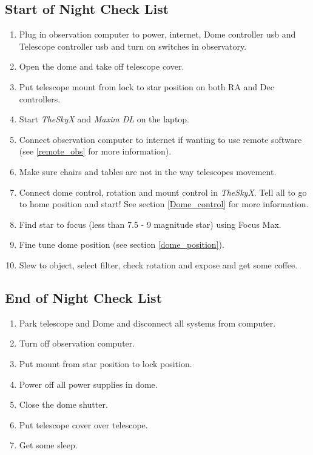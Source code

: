 \documentclass[12pt,twoside,a4paper]{report}
\begin{document}

\subsection{Start of Night Check List}

\begin{enumerate}
 \item Plug in observation computer to power, internet, Dome controller usb and Telescope controller usb and turn on switches in observatory.
 \item Open the dome and take off telescope cover.
 \item Put telescope mount from lock to star position on both RA and Dec controllers.
 \item Start \emph{TheSkyX} and \emph{Maxim DL} on the laptop.
 \item Connect observation computer to internet if wanting to use remote software (see \ref{remote_obs} for more information). 
 \item Make sure chairs and tables are not in the way telescopes movement.
 \item Connect dome control, rotation and mount control in \emph{TheSkyX}. Tell all to go to home position and start! 
See section \ref{Dome_control} for more information.
 \item Find star to focus (less than 7.5 - 9 magnitude star) using Focus Max.
  \item Fine tune dome position (see section \ref{dome_position}).
 \item Slew to object, select filter, check rotation and expose and get some coffee.
 
\end{enumerate}


\subsection{End of Night Check List}


\begin{enumerate}
 \item Park telescope and Dome and disconnect all systems from computer.
 \item Turn off observation computer.
 \item Put mount from star position to lock position.
 \item Power off all power supplies in dome.
 \item Close the dome shutter.
 \item Put telescope cover over telescope.
 \item Get some sleep.
\end{enumerate}
\end{document}
